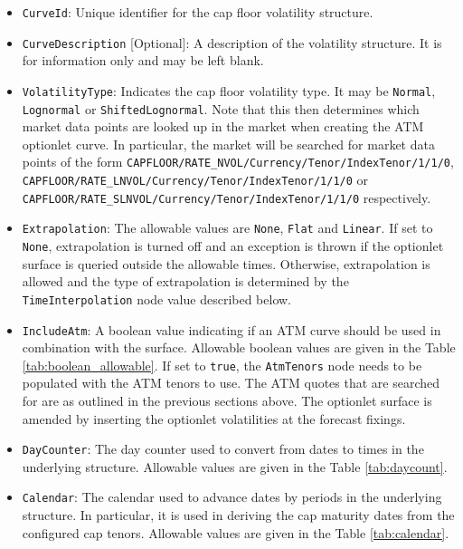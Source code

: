 \begin{itemize}
\item
\lstinline!CurveId!: Unique identifier for the cap floor volatility structure.

\item \lstinline!CurveDescription! [Optional]:
A description of the volatility structure. It is for information only and may be left blank.

\item \lstinline!VolatilityType!:
Indicates the cap floor volatility type. It may be \lstinline!Normal!, \lstinline!Lognormal! or \lstinline!ShiftedLognormal!. Note that this then determines which market data points are looked up in the market when creating the ATM optionlet curve. In particular, the market will be searched for market data points of the form \lstinline!CAPFLOOR/RATE_NVOL/Currency/Tenor/IndexTenor/1/1/0!, \lstinline!CAPFLOOR/RATE_LNVOL/Currency/Tenor/IndexTenor/1/1/0! or \lstinline!CAPFLOOR/RATE_SLNVOL/Currency/Tenor/IndexTenor/1/1/0! respectively.

\item \lstinline!Extrapolation!:
The allowable values are \lstinline!None!, \lstinline!Flat! and \lstinline!Linear!. If set to \lstinline!None!, extrapolation is turned off and an exception is thrown if the optionlet surface is queried outside the allowable times. Otherwise, extrapolation is allowed and the type of extrapolation is determined by the \lstinline!TimeInterpolation! node value described below.

\item \lstinline!IncludeAtm!:
A boolean value indicating if an ATM curve should be used in combination with the surface. Allowable boolean values are given in the Table \ref{tab:boolean_allowable}. If set to \lstinline!true!, the \lstinline!AtmTenors! node needs to be populated with the ATM tenors to use. The ATM quotes that are searched for are as outlined in the previous sections above. The optionlet surface is amended by inserting the optionlet volatilities at the forecast fixings.

\item \lstinline!DayCounter!:
The day counter used to convert from dates to times in the underlying structure. Allowable values are given in the Table \ref{tab:daycount}.

\item \lstinline!Calendar!:
The calendar used to advance dates by periods in the underlying structure. In particular, it is used in deriving the cap maturity dates from the configured cap tenors. Allowable values are given in the Table \ref{tab:calendar}.


\end{itemize}

